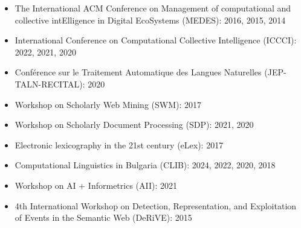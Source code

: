 \begin{itemize}
    \item The International ACM Conference on Management of computational and collective intElligence in Digital EcoSystems (MEDES): 2016, 2015, 2014
    \item International Conference on Computational Collective Intelligence (ICCCI): 2022, 2021, 2020
    \item Conférence sur le Traitement Automatique des Langues Naturelles (JEP-TALN-RECITAL): 2020
    \item Workshop on Scholarly Web Mining (SWM): 2017
    \item Workshop on Scholarly Document Processing (SDP): 2021, 2020
    \item Electronic lexicography in the 21st century (eLex): 2017
    \item Computational Linguistics in Bulgaria (CLIB): 2024, 2022, 2020, 2018
    \item Workshop on AI + Informetrics (AII): 2021
    \item 4th International Workshop on Detection, Representation, and Exploitation of Events in the Semantic Web (DeRiVE): 2015
\end{itemize}

\subsection{}




\section{}




